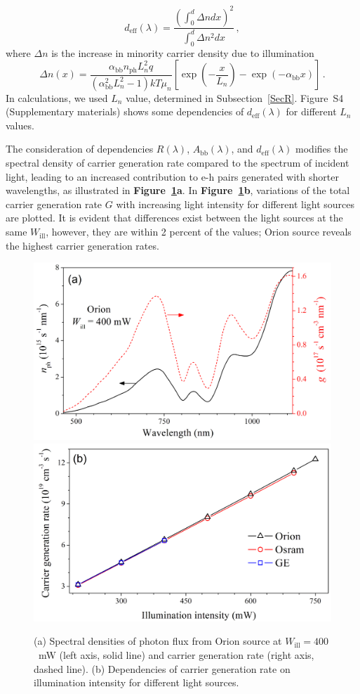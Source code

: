 \documentclass{WileyMSP-template}
\begin{document}
\begin{equation}
\label{eqdeff}
d_\mathrm{eff}(\lambda)=\frac{\left(\int_0^d \Delta n dx\right)^2}{\int_0^d \Delta n^2 dx}\,,
\end{equation}
where
$\Delta n$ is the increase in minority carrier density due to illumination
\begin{equation}
\label{eqdeln}
\Delta n (x)=\frac{\alpha_\mathrm{bb} n_\mathrm{ph} L_n^2 q}{(\alpha_\mathrm{bb}^2 L_n^2-1)kT\mu_n}
\left[\exp\left(-\frac{x}{L_n}\right)-\exp\left(-\alpha_\mathrm{bb} x\right)\right]\,.
\end{equation}
In calculations, we used $L_n$ value, determined in Subsection~\ref{SecR}.
Figure~S4 (Supplementary materials) shows some dependencies of $d_\mathrm{eff}(\lambda)$ for different $L_n$ values.

The consideration of dependencies $R(\lambda)$, $A_\mathrm{bb}(\lambda)$, and $d_\mathrm{eff}(\lambda)$ modifies
the spectral density of carrier generation rate compared to the spectrum of incident light,
leading to an increased contribution to e-h pairs generated with shorter wavelengths,
as illustrated in \textbf{Figure~\ref{fig5}a}.
In \textbf{Figure~\ref{fig5}b}, variations of the total carrier generation rate $G$ with increasing light intensity for different light sources are plotted.
It is evident that differences exist between the light sources at the same $W_\mathrm{ill}$,
however, they are within 2 percent of the values;
Orion source reveals the highest carrier generation rates.

\begin{figure}
\centering
  \includegraphics[width=0.4\linewidth]{Fig5a.png}
  \includegraphics[width=0.4\linewidth]{Fig5b.png}
  \caption{
  (a) Spectral densities of photon flux from Orion source at $W_\mathrm{ill}=400$~mW (left axis, solid line) and carrier generation rate (right axis, dashed line).
  (b) Dependencies of carrier generation rate on illumination intensity for different light sources.
  }
  \label{fig5}
\end{figure}
\end{document}
